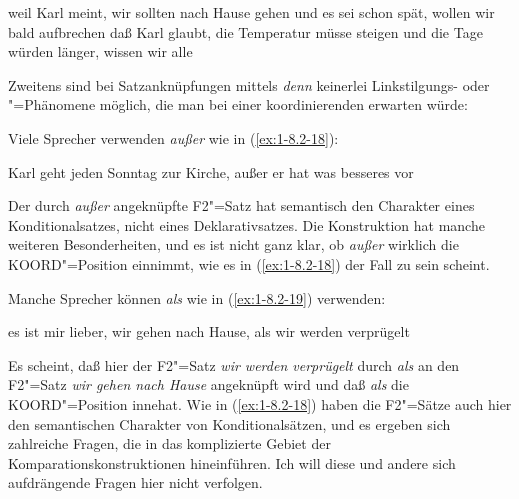 \documentclass[output=paper]{langsci/langscibook}
\begin{document}
\begin{exe}
\ex\label{ex:1-8.2-16}
\begin{xlist}
\ex\label{ex:1-8.2-16a} weil Karl meint, wir sollten nach Hause gehen und es sei schon spät, wollen wir bald aufbrechen
\ex\label{ex:1-8.2-16b} daß Karl glaubt, die Temperatur müsse steigen und die Tage würden länger, wissen wir alle
\end{xlist}
\end{exe}
Zweitens sind bei Satzanknüpfungen mittels \textit{denn} keinerlei Linkstilgungs- oder
"=Phänomene möglich, die man bei einer koordinierenden  
erwarten würde:
\begin{exe}
\ex\label{ex:1-8.2-17}
\begin{xlist}
\end{xlist}
\end{exe}
Viele Sprecher verwenden \textit{außer} wie in (\ref{ex:1-8.2-18}):
\begin{exe}
\ex\label{ex:1-8.2-18}
Karl geht jeden Sonntag zur Kirche, außer er hat was besseres vor
\end{exe}
Der durch \textit{außer} angeknüpfte F2"=Satz hat semantisch den Charakter eines Konditionalsatzes, nicht eines Deklarativsatzes. Die Konstruktion hat manche weiteren Besonderheiten, und es ist nicht ganz klar, ob \textit{außer} wirklich die KOORD"=Position
einnimmt, wie es in (\ref{ex:1-8.2-18}) der Fall zu sein scheint.

Manche Sprecher können \textit{als} wie in (\ref{ex:1-8.2-19}) verwenden:
\begin{exe}
\ex\label{ex:1-8.2-19}
es ist mir lieber, wir gehen nach Hause, als wir werden verprügelt
\end{exe}
Es scheint, daß hier der F2"=Satz \textit{wir werden verprügelt} durch \textit{als} an den F2"=Satz \textit{wir gehen nach Hause} angeknüpft wird und daß \textit{als} die KOORD"=Position innehat. Wie in (\ref{ex:1-8.2-18}) haben die F2"=Sätze auch hier den semantischen Charakter von Konditionalsätzen, und es ergeben sich zahlreiche Fragen, die in das komplizierte Gebiet der Komparationskonstruktionen hineinführen. Ich will diese und andere sich aufdrängende Fragen hier nicht verfolgen.
\end{document}
